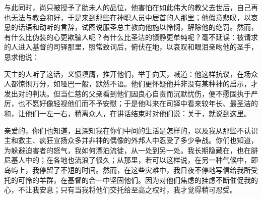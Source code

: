 与此同时，尚只被授予了肋未人的品位，他害怕在如此伟大的教父去世后，自己再也无法与教会和好，于是来到那些在神职人员中居首的人那里；他假意悲叹，以哀恳的话语和动听的言辞，试图说服圣总主教向他施以怜悯，解除他的绝罚。然而，有什么比伪装的心更欺骗人呢？有什么比圣洁的镇静更单纯呢？毫不延误：被请求的人进入基督的司铎那里，照常致词后，俯伏在地，以哀叹和眼泪亲吻他的圣手，恳求他说：\par

天主的人听了这话，义愤填膺，推开他们，举手向天，喊道：他这样抗议，在场众人都惊惧万分，如哑巴一般，默然不语。他们更怀疑他并非没有某种神的启示，才发出对的判决。但当仁慈的父亲看到他们因良心自责而沉默忧伤，便不愿固执于严厉，也不愿好像轻视他们而不予安慰；于是他叫来在司铎中看来较年长、最圣洁的和，让他们一左一右，稍离众人，在讲话结束时对他们说：\newline{}关于，就说到这里。\par

亲爱的，你们也知道，且深知我在你们中间的生活是怎样的，以及我从那些不认识主和救主、疯狂宣扬众多并非神的偶像的外邦人中忍受了多少争战。你们也知道，为躲避迫害者的怒气，我如何漂泊流徙，从一处到另一处。我长期隐藏在，也在腓尼基人中的；在各地也流浪了很久；从那里，若可以这样说，在另一种气候中，即岛屿上，我停留了不短的时间。然而，在这些灾难中，我日夜不停地写信给我所受托的可怜的羊群，在基督的合一中坚固他们。因为对他们焦虑的挂虑不断催促我的心，不让我安息；只有当我将他们交托给至高之权时，我才觉得稍可忍受。\par


